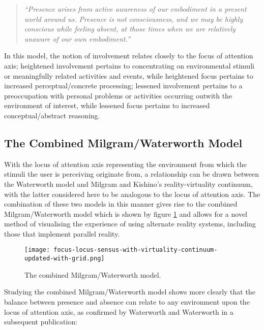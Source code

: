 \begin{quote}
	\textit{``Presence arises from active awareness of our embodiment in a present world around us. Presence is not consciousness, and we may be highly conscious while feeling absent, at those times when we are relatively unaware of our own embodiment.''}~\cite{Waterworth2014}
\end{quote}

In this model, the notion of involvement relates closely to the focus of attention axis; heightened involvement pertains to concentrating on environmental stimuli or meaningfully related activities and events, while heightened focus pertains to increased perceptual/concrete processing; lessened involvement pertains to a preoccupation with personal problems or activities occurring outwith the environment of interest, while lessened focus pertains to increased conceptual/abstract reasoning.


\subsection{The Combined Milgram/Waterworth Model}
\label{combined-milgram-waterworth-model}
With the locus of attention axis representing the environment from which the stimuli the user is perceiving originate from, a relationship can be drawn between the Waterworth model and Milgram and Kishino's reality-virtuality continuum, with the latter considered here to be analogous to the locus of attention axis. The combination of these two models in this manner gives rise to the combined Milgram/Waterworth model which is shown by figure \ref{focus-locus-sensus-with-virtuality-continuum} and allows for a novel method of visualising the experience of using alternate reality systems, including those that implement parallel reality.

\begin{figure}[h]
	\begin{center}
		\texttt{[image: focus-locus-sensus-with-virtuality-continuum-updated-with-grid.png]}
		\caption{The combined Milgram/Waterworth model.}
		\label{focus-locus-sensus-with-virtuality-continuum}
	\end{center}	
\end{figure}

Studying the combined Milgram/Waterworth model shows more clearly that the balance between presence and absence can relate to any environment upon the locus of attention axis, as confirmed by Waterworth and Waterworth in a subsequent publication:

